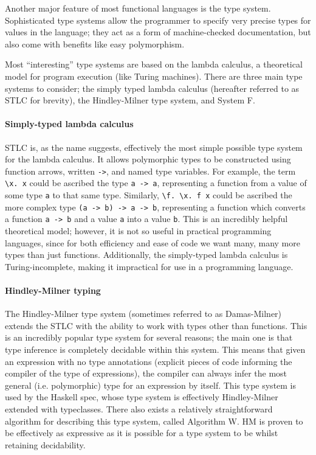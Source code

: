 \documentclass[9pt]{extarticle}
\begin{document}
Another major feature of most functional languages is the type system.
Sophisticated type systems allow the programmer to specify very precise types
for values in the language; they act as a form of machine-checked documentation,
but also come with benefits like easy polymorphism.

Most ``interesting'' type systems are based on the lambda calculus, a theoretical
model for program execution (like Turing machines). There are three main type
systems to consider; the simply typed lambda calculus (hereafter referred to as
STLC for brevity), the Hindley-Milner type system, and System F.

\paragraph{Simply-typed lambda calculus}

STLC is, as the name suggests, effectively the most simple possible type
system for the lambda calculus. It allows polymorphic types to be
constructed using function arrows, written \verb'->', and named type
variables. For example, the term \verb'\x. x' could be ascribed the type
\verb'a -> a', representing a function from a value of some type
\verb'a' to that same type. Similarly, \verb'\f. \x. f x' could be
ascribed the more complex type \verb'(a -> b) -> a -> b', representing a
function which converts a function \verb'a -> b' and a value \verb'a'
into a value \verb'b'. This is an incredibly helpful theoretical model;
however, it is not so useful in practical programming languages, since
for both efficiency and ease of code we want many, many more types than
just functions. Additionally, the simply-typed lambda calculus is
Turing-incomplete, making it impractical for use in a programming
language.

\paragraph{Hindley-Milner typing}

The Hindley-Milner type system (sometimes referred to as Damas-Milner) extends
the STLC with the ability to work with types other than functions. This
is an incredibly popular type system for several reasons; the main one
is that type inference is completely decidable within this system.  This
means that given an expression with no type annotations (explicit pieces
of code informing the compiler of the type of expressions), the compiler
can always infer the most general (i.e.  polymorphic) type for an
expression by itself. This type system is used by the Haskell spec,
whose type system is effectively Hindley-Milner extended with
typeclasses. There also exists a relatively straightforward algorithm
for describing this type system, called Algorithm W. HM is proven to be
effectively as expressive as it is possible for a type system to be
whilst retaining decidability.
\end{document}

